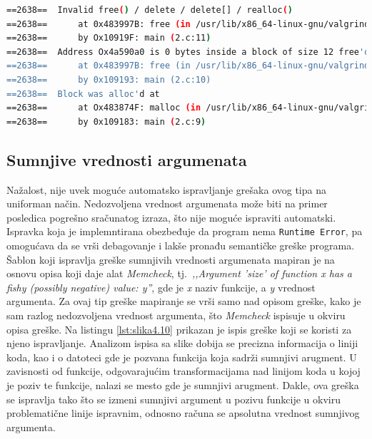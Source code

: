 \documentclass[12pt,oneside]{memoir}
\theoremstyle{plain}
\theoremstyle{definition}
\begin{document}

\begin{lstlisting}[style=terminal,caption={Ispis greške nevalidnog oslobađanja memorije}, label={lst:slika4.9},language={bash}]   
==2638==  Invalid free() / delete / delete[] / realloc()
==2638==      at 0x483997B: free (in /usr/lib/x86_64-linux-gnu/valgrind/vgpreload_memcheck-amd64-linux.so) 
==2638==      by Ox10919F: main (2.c:11)
==2638==  Address Ox4a590a0 is 0 bytes inside a block of size 12 free'd
==2638==      at 0x483997B: free (in /usr/lib/x86_64-linux-gnu/valgrind/vgpreload_memcheck-amd64-linux.so) 
==2638==      by 0x109193: main (2.c:10)
==2638==  Block was alloc'd at
==2638==      at Ox483874F: malloc (in /usr/lib/x86_64-linux-gnu/valgrind/vgpreload_memcheck-amd64-linux.so) 
==2638==      by 0x109183: main (2.c:9)
\end{lstlisting}

\subsection{Sumnjive vrednosti argumenata}
Nažalost, nije uvek moguće automatsko ispravljanje grešaka ovog tipa na uniforman način. Nedozvoljena vrednost argumenata može biti na primer posledica pogrešno sračunatog izraza, što nije moguće ispraviti automatski. Ispravka koja je implemntirana obezbeđuje da program nema \texttt{Runtime Error}, pa omogućava da se vrši debagovanje i lakše pronađu semantičke greške programa. Šablon koji ispravlja greške sumnjivih vrednosti argumenata mapiran je na osnovu opisa koji daje alat \textit{Memcheck}, tj.~\textit{,,Argument 'size' of function x has a fishy (possibly negative) value: y''}, gde je \textit{x} naziv funkcije, a \textit{y} vrednost argumenta. Za ovaj tip greške mapiranje se vrši samo nad opisom greške, kako je sam razlog nedozvoljena vrednost argumenta, što \textit{Memcheck} ispisuje u okviru opisa greške. Na listingu \ref{lst:slika4.10} prikazan je ispis greške koji se  koristi za njeno ispravljanje. Analizom ispisa sa slike dobija se precizna informacija o liniji koda, kao i o datoteci gde je pozvana funkcija koja sadrži sumnjivi arugment. U zavisnosti od funkcije, odgovarajućim transformacijama nad linijom koda u kojoj je poziv te funkcije, nalazi se mesto gde je sumnjivi arugment. Dakle, ova greška se ispravlja tako što se izmeni sumnjivi argument u pozivu funkcije u okviru problematične linije ispravnim, odnosno računa se apsolutna vrednost sumnjivog argumenta. 
\end{document}
